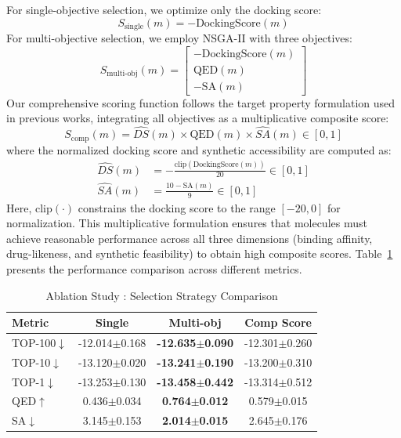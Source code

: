 \documentclass[lettersize,journal]{IEEEtran}
\begin{document}
For single-objective selection, we optimize only the docking score:
\begin{equation}
S_{\text{single}}(m) = -\text{DockingScore}(m)
\end{equation}
For multi-objective selection, we employ NSGA-II\cite{deb2002fast} with three objectives:
\begin{equation}
    S_{\text{multi-obj}}(m) = \begin{bmatrix} -\text{DockingScore}(m) \\ \text{QED}(m) \\ -\text{SA}(m) \end{bmatrix}
\end{equation}
Our comprehensive scoring function follows the target property formulation used in previous works, integrating all objectives as a multiplicative composite score:
\begin{equation}
S_{\text{comp}}(m) =  \widehat{DS}(m) \times \text{QED}(m) \times \widehat{SA}(m) \in [0,1]
\end{equation}
where the normalized docking score and synthetic accessibility are computed as:
\begin{align}
\widehat{DS}(m) &= -\frac{\text{clip}(\text{DockingScore}(m))}{20} \in [0,1] \\
\widehat{SA}(m) &= \frac{10 - \text{SA}(m)}{9} \in [0,1]
\end{align}
Here, $\text{clip}(\cdot)$ constrains the docking score to the range $[-20, 0]$ for normalization. This multiplicative formulation ensures that molecules must achieve reasonable performance across all three dimensions (binding affinity, drug-likeness, and synthetic feasibility) to obtain high composite scores.
Table~\ref{tab:selection_ablation} presents the performance comparison across different metrics.
\begin{table}[!t]
    \caption{Ablation Study \uppercase\expandafter{}: Selection Strategy Comparison}
    \label{tab:selection_ablation}
    \centering    
    \small
    \setlength{\tabcolsep}{4pt}
    
    \begin{tabular}{l c c c}
        \hline\hline
        Metric & Single & Multi-obj & Comp Score \\
        \hline
        TOP-100$\downarrow$ & -12.014$\pm$0.168 & \textbf{-12.635$\pm$0.090} & -12.301$\pm$0.260 \\
        TOP-10$\downarrow$ & -13.120$\pm$0.020 & \textbf{-13.241$\pm$0.190} & -13.200$\pm$0.310 \\
        TOP-1$\downarrow$ & -13.253$\pm$0.130 & \textbf{-13.458$\pm$0.442} & -13.314$\pm$0.512 \\
        QED$\uparrow$ & 0.436$\pm$0.034 & \textbf{0.764$\pm$0.012} & 0.579$\pm$0.015 \\
        SA$\downarrow$ & 3.145$\pm$0.153 & \textbf{2.014$\pm$0.015} & 2.645$\pm$0.176 \\
        \hline\hline
    \end{tabular}
\end{table}
\end{document}
